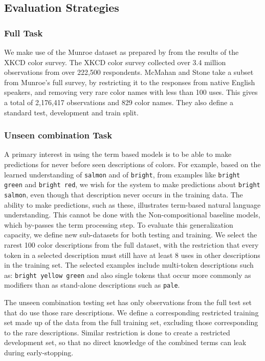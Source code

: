 \documentclass[]{clv3}
\newcommand{\parencite}{\citep}
\newcommand{\textcite}{\citet}
\newcommand{\empmodel}{Non-compositional baseline}
\begin{document}
\subsection{Evaluation Strategies}

\subsubsection{Full Task}
We make use of the  Munroe dataset as prepared by \textcite{mcmahan2015bayesian} from the results of the XKCD color survey.
The XKCD color survey \parencite{Munroe2010XKCDdataset} collected over 3.4 million observations from over 222,500 respondents.
McMahan and Stone take a subset from Munroe's full survey, by restricting it to the responses from native English speakers, 
and removing very rare color names with less than 100 uses.
This gives a total of 2,176,417 observations and 829 color names. 
They also define a standard test, development and train split.


\subsubsection{Unseen combination Task} \label{sec:extrapodata}
A primary interest in using the term based models is to be able to make predictions for never before seen descriptions of colors.
For example, based on the learned understanding of \texttt{salmon} and of \texttt{bright}, from examples like \texttt{bright green} and \texttt{bright red}, we wish for the system to make predictions about \texttt{bright salmon}, even though that description never occurs in the training data.
The ability to make predictions, such as these, illustrates term-based natural language understanding.
This cannot be done with the \empmodel{} models, which by-passes the term processing step.
%
To evaluate this generalization capacity, we define new sub-datasets for both testing and training.
We select the rarest 100 color descriptions from the full dataset,
with the restriction that every token in a selected description must still have at least 8 uses in other descriptions in the training set.
The selected examples include multi-token descriptions such as: \texttt{bright yellow green} and also single tokens that occur more commonly as modifiers than as stand-alone descriptions such as \texttt{pale}.

The unseen combination testing set has only observations from the full test set that do use those rare descriptions.
We define a corresponding restricted training set made up of the data from the full training set, excluding those  corresponding to the rare descriptions.
Similar restriction is done to create a restricted development set, so that no direct knowledge of the combined terms can leak during early-stopping.
\end{document}
